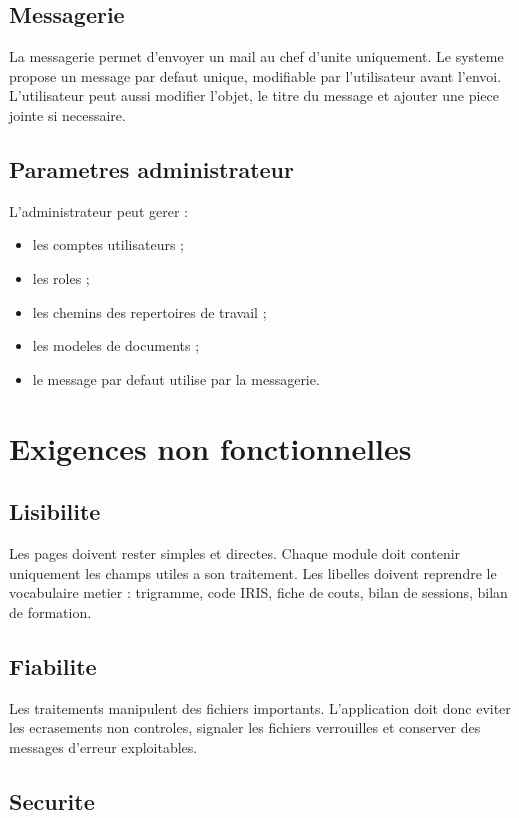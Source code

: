 \documentclass[11pt,a4paper]{report}
\begin{document}
\section{Messagerie}

La messagerie permet d'envoyer un mail au chef d'unite uniquement. Le systeme propose un message par defaut unique, modifiable par l'utilisateur avant l'envoi. L'utilisateur peut aussi modifier l'objet, le titre du message et ajouter une piece jointe si necessaire.

\section{Parametres administrateur}

L'administrateur peut gerer :

\begin{itemize}
  \item les comptes utilisateurs ;
  \item les roles ;
  \item les chemins des repertoires de travail ;
  \item les modeles de documents ;
  \item le message par defaut utilise par la messagerie.
\end{itemize}

\chapter{Exigences non fonctionnelles}

\section{Lisibilite}

Les pages doivent rester simples et directes. Chaque module doit contenir uniquement les champs utiles a son traitement. Les libelles doivent reprendre le vocabulaire metier : trigramme, code IRIS, fiche de couts, bilan de sessions, bilan de formation.

\section{Fiabilite}

Les traitements manipulent des fichiers importants. L'application doit donc eviter les ecrasements non controles, signaler les fichiers verrouilles et conserver des messages d'erreur exploitables.

\section{Securite}
\end{document}
